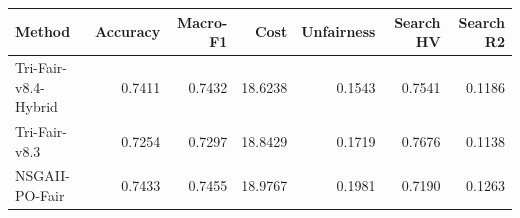 \begin{tabular}{lrrrrrr}
\hline
Method & Accuracy & Macro-F1 & Cost & Unfairness & Search HV & Search R2 \\
\hline
Tri-Fair-v8.4-Hybrid & 0.7411 & 0.7432 & 18.6238 & 0.1543 & 0.7541 & 0.1186 \\
Tri-Fair-v8.3 & 0.7254 & 0.7297 & 18.8429 & 0.1719 & 0.7676 & 0.1138 \\
NSGAII-PO-Fair & 0.7433 & 0.7455 & 18.9767 & 0.1981 & 0.7190 & 0.1263 \\
\hline
\end{tabular}